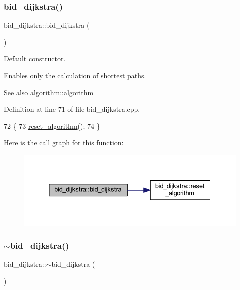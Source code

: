 \subsubsection{\texorpdfstring{bid\+\_\+dijkstra()}{bid\_dijkstra()}}
{\footnotesize\ttfamily bid\+\_\+dijkstra\+::bid\+\_\+dijkstra (\begin{DoxyParamCaption}{ }\end{DoxyParamCaption})}



Default constructor. 

Enables only the calculation of shortest paths.

\begin{DoxySeeAlso}{See also}
\mbox{\hyperlink{classalgorithm_ab79e1ddec2f2afdf4b36b10724db8b15}{algorithm\+::algorithm}} 
\end{DoxySeeAlso}


Definition at line 71 of file bid\+\_\+dijkstra.\+cpp.


\begin{DoxyCode}
72 \{
73     \mbox{\hyperlink{classbid__dijkstra_a16574970a28a3f453011e5b98d63e191}{reset\_algorithm}}();
74 \}
\end{DoxyCode}
Here is the call graph for this function\+:\nopagebreak
\begin{figure}[H]
\begin{center}
\leavevmode
\includegraphics[width=332pt]{classbid__dijkstra_a1f9ddd95b88b24f45afe0966c2ae181b_cgraph}
\end{center}
\end{figure}
\mbox{\label{classbid__dijkstra_a3d46b327a3a87ac874e3930227a13757}} 
\subsubsection{\texorpdfstring{$\sim$bid\+\_\+dijkstra()}{~bid\_dijkstra()}}
{\footnotesize\ttfamily bid\+\_\+dijkstra\+::$\sim$bid\+\_\+dijkstra (\begin{DoxyParamCaption}{ }\end{DoxyParamCaption})\hspace{0.3cm}{\ttfamily [virtual]}}



